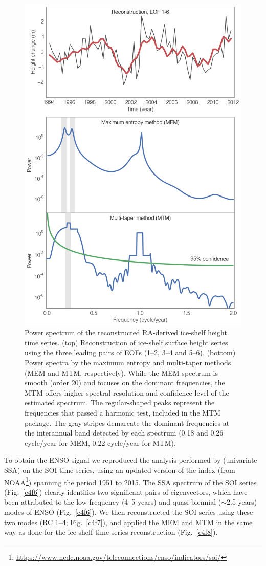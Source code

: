 \begin{figure}[!ht]
  \centering
  \includegraphics[width=.72\textwidth]{img/mem_mtm_amu_v2.png}
  \caption[Power spectrum of ice-shelf height reconstructions]{
  Power spectrum of the reconstructed RA-derived ice-shelf height time series. (top) Reconstruction of ice-shelf surface height series using the three leading pairs of EOFs (1--2, 3--4 and 5--6). (bottom) Power spectra by the maximum entropy and multi-taper methods (MEM and MTM, respectively). While the MEM spectrum is smooth (order 20) and focuses on the dominant frequencies, the MTM offers higher spectral resolution and confidence level of the estimated spectrum. The regular-shaped peaks represent the frequencies that passed a harmonic test, included in the MTM package. The gray stripes demarcate the dominant frequencies at the interannual band detected by each spectrum (0.18 and 0.26 cycle/year for MEM, 0.22 cycle/year for MTM).
  }
  \label{c4f5}
\end{figure}


To obtain the ENSO signal we reproduced the analysis performed by \textcite{Ghil2002} (univariate SSA) on the SOI time series, using an updated version of the index (from NOAA\footnote{\url{https://www.ncdc.noaa.gov/teleconnections/enso/indicators/soi/}}) spanning the period 1951 to 2015. The SSA spectrum of the SOI series (Fig.~\ref{c4f6}) clearly identifies two significant pairs of eigenvectors, which have been attributed to the low-frequency (4--5 years) and quasi-biennial ($\sim$2.5 years) modes of ENSO \parencite[e.g.,][]{Ghil2002, Philander1989} (Fig.~\ref{c4f6}). We then reconstructed the SOI series using these two modes (RC 1--4; Fig.~\ref{c4f7}), and applied the MEM and MTM in the same way as done for the ice-shelf time-series reconstruction (Fig.~\ref{c4f8}). 


